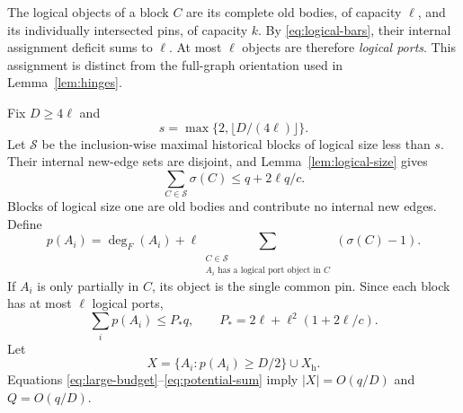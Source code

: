 \documentclass[11pt,a4paper]{article}
\theoremstyle{definition}
\theoremstyle{remark}
\begin{document}
The logical objects of a block $C$ are its complete old
bodies, of capacity $\ell$, and its individually intersected
pins, of capacity $k$. By \eqref{eq:logical-bars}, their
internal assignment deficit sums to $\ell$.
At most $\ell$ objects are therefore \emph{logical ports}.
This assignment is distinct from the full-graph orientation
used in Lemma~\ref{lem:hinges}.

Fix $D\geq4\ell$ and
\[
 s=\max\{2,\lfloor D/(4\ell)\rfloor\}.
\]
Let $\mathcal S$ be the inclusion-wise maximal historical
blocks of logical size less than $s$.
Their internal new-edge sets are disjoint, and
Lemma~\ref{lem:logical-size} gives
\[
 \sum_{C\in\mathcal S}\sigma(C)\leq q+2\ell q/c.
\]
Blocks of logical size one are old bodies and contribute
no internal new edges.
Define
\begin{equation}\label{eq:potential}
 p(A_i)=\deg_F(A_i)+
 \ell\sum_{\substack{C\in\mathcal S\\
             A_i\text{ has a logical port object in }C}}
          (\sigma(C)-1).
\end{equation}
If $A_i$ is only partially in $C$, its object is the
single common pin. Since each block has at most $\ell$
logical ports,
\begin{equation}\label{eq:potential-sum}
 \sum_i p(A_i)\leq P_*q,\qquad
 P_*=2\ell+\ell^2(1+2\ell/c).
\end{equation}
Let
\[
 X=\{A_i:p(A_i)\geq D/2\}\cup X_{\mathrm h}.
\]
Equations \eqref{eq:large-budget}--\eqref{eq:potential-sum}
imply $|X|=O(q/D)$ and $Q=O(q/D)$.
\end{document}
